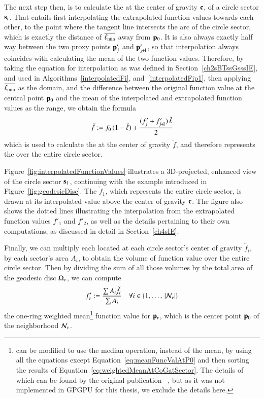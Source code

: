 The next step then, is to calculate the \wmfv{} at the center of gravity $\mathbf{c}$, of a circle sector $\mathbf{s}_i$. That entails first interpolating the extrapolated function values towards each other, to the point where the tangent line intersects the arc of the circle sector, which is exactly the distance of $\overline{\ell_\text{min}}$ away from $\mathbf{p}_0$. It is also always exactly half way between the two proxy points $\mathbf{p}'_j$ and $\bp'_{\sjpo}$, so that interpolation always coincides with calculating the mean of the two function values. Therefore, by taking the equation for interpolation as was defined in Section~\ref{ch2sBTssGsssIE}, and used in Algorithms~\ref{interpolatedFi}, and~\ref{interpolatedFip1}, then applying $\overline{\ell_\text{min}}$ as the domain, and the difference between the original function value at the central point $\mathbf{p}_0$ and the mean of the interpolated and extrapolated function values as the range, we obtain the formula
%
\begin{equation}
	\check{f} := f_0\,(1 - \check{\ell}) + \frac{(f'_j + f'_{\sjpo})\,\check{\ell}}{2}
	\label{eq:weightedMeanAtCoGatSector}
\end{equation}%
%
which is used to calculate the \wmfv{} at the center of gravity $\check{f}$, and therefore represents the \wmfv{} over the entire circle sector.

Figure~\ref{fig:interpolatedFunctionValues} illustrates a 3D-projected, enhanced view of the circle sector $\mathbf{s}_1$, continuing with the example introduced in Figure~\ref{fig:geodesicDisc}. The \wmfv{} $\check{f}_1$, which represents the entire circle sector, is drawn at its interpolated value above the center of gravity $\mathbf{c}$. The figure also shows the dotted lines illustrating the interpolation from the extrapolated function values $f'_1$ and $f'_2$, as well as the details pertaining to their own computations, as discussed in detail in Section~\ref{ch4sIE}.

Finally, we can multiply each \wmfv{} located at each circle sector's center of gravity $\check{f}_i$, by each sector's area $A_i$, to obtain the volume of function value over the entire circle sector. Then by dividing the sum of all those volumes by the total area of the geodesic disc $\Omega_v$, we can compute
%
\begin{equation}
	f'_v := \frac{\sum A_i\check{f}_i}{\sum A_i} \quad \forall i \in \{1,\ldots,\,|\mathcal{N}_v|\}
	\label{eq:meanFuncValAtPv}
\end{equation}%
%
the one-ring weighted mean\footnote{ can be modified to use the median operation, instead of the mean, by using all the equations except Equation~\ref{eq:meanFuncValAtP0} and then sorting the results of Equation~\ref{eq:weightedMeanAtCoGatSector}. The details of which can be found by the original publication ~\cite[s.~3.2]{Mara17}, but as it was not implemented in GPGPU for this thesis, we exclude the details here.} function value for $\mathbf{p}_v$, which is the center point $\mathbf{p}_0$ of the neighborhood $\mathcal{N}_v$.

